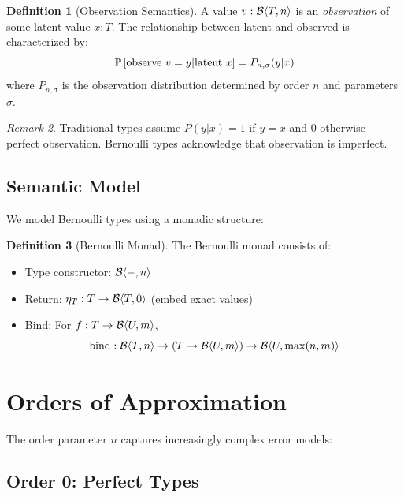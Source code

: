 \documentclass[11pt,twoside,openright]{book}
\theoremstyle{definition}
\newtheorem{definition}{Definition}[chapter]
\theoremstyle{plain}
\theoremstyle{remark}
\newtheorem{remark}[definition]{Remark}
\begin{document}
\begin{definition}[Observation Semantics]
A value $v : \mathcal{B}\langle T, n \rangle$ is an \emph{observation} of some latent value $x : T$. The relationship between latent and observed is characterized by:
\begin{equation}
\mathbb{P}\left[\text{observe } v = y | \text{latent } x\right] = P_{n,\sigma}(y|x)
\end{equation}
where $P_{n,\sigma}$ is the observation distribution determined by order $n$ and parameters $\sigma$.
\end{definition}

\begin{remark}
Traditional types assume $P(y|x) = 1$ if $y = x$ and $0$ otherwise—perfect observation. Bernoulli types acknowledge that observation is imperfect.
\end{remark}

\subsection{Semantic Model}

We model Bernoulli types using a monadic structure:

\begin{definition}[Bernoulli Monad]
The Bernoulli monad consists of:
\begin{itemize}
    \item Type constructor: $\mathcal{B}\langle -, n \rangle$
    \item Return: $\eta_T: T \to \mathcal{B}\langle T, 0 \rangle$ (embed exact values)
    \item Bind: For $f: T \to \mathcal{B}\langle U, m \rangle$,
    \begin{equation}
    \text{bind}: \mathcal{B}\langle T, n \rangle \to (T \to \mathcal{B}\langle U, m \rangle) \to \mathcal{B}\langle U, \max(n,m) \rangle
    \end{equation}
\end{itemize}
\end{definition}

\section{Orders of Approximation}

The order parameter $n$ captures increasingly complex error models:

\subsection{Order 0: Perfect Types}
\end{document}
